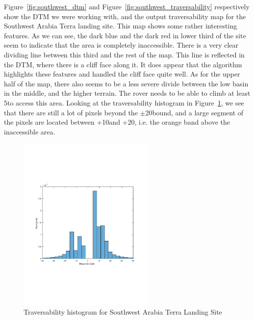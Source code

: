 \documentclass[12pt]{article}
\begin{document}
\par Figure~\ref{fig:southwest_dtm} and Figure~\ref{fig:southwest_traversability} respectively show the DTM we were working with, and the output traversability map for the Southwest Arabia Terra landing site. This map shows some rather interesting features. As we can see, the dark blue and the dark red in lower third of the site seem to indicate that the area is completely inaccessible. There is a very clear dividing line between this third and the rest of the map. This line is reflected in the DTM, where there is a cliff face along it. It does appear that the algorithm highlights these features and handled the cliff face quite well. As for the upper half of the map, there also seems to be a less severe divide between the low basin in the middle, and the higher terrain. The rover needs to be able to climb at least 5\textdegree to access this area. Looking at the traversability histogram in Figure~\ref{fig:southwest_hist}, we see that there are still a lot of pixels beyond the $\pm$20\textdegree bound, and a large segment of the pixels are located between +10\textdegree and +20\textdegree, i.e. the orange band above the inaccessible area.

\begin{figure}[h!]
  \centering
  \includegraphics[width=0.6\textwidth]{figures/maps/ESP_011844_1855/DTEEC_011844_1855_002812_1855_A01-hist.pdf}
  \caption{Traversability histogram for Southwest Arabia Terra Landing Site}
  \label{fig:southwest_hist}
\end{figure}
\end{document}
